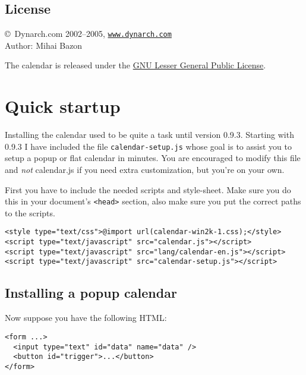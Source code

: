 \documentclass[a4paper,twoside,10pt]{dynadoc}
\begin{document}
\subsection{License}

\begin{center}
\noindent \copyright\ Dynarch.com 2002--2005,
\href{http://www.dynarch.com/}{\texttt{www.dynarch.com}}\\
Author: Mihai Bazon
\end{center}

The calendar is released under the
{\href{http://www.gnu.org/licenses/lgpl.html}{GNU Lesser General Public License}}.




\section{Quick startup}\label{sec:quick-start}

Installing the calendar used to be quite a task until version 0.9.3.  Starting
with 0.9.3 I have included the file \texttt{calendar-setup.js} whose goal is to
assist you to setup a popup or flat calendar in minutes.  You are
encouraged to modify this file and \emph{not} calendar.js if you need
extra customization, but you're on your own.

First you have to include the needed scripts and style-sheet.  Make sure you do
this in your document's \texttt{<head>} section, also make sure you put the
correct paths to the scripts.

\begin{verbatim}
<style type="text/css">@import url(calendar-win2k-1.css);</style>
<script type="text/javascript" src="calendar.js"></script>
<script type="text/javascript" src="lang/calendar-en.js"></script>
<script type="text/javascript" src="calendar-setup.js"></script>
\end{verbatim}

\subsection{Installing a popup calendar}\label{sec:quick-start-popup}

\noindent Now suppose you have the following HTML:

\begin{verbatim}
<form ...>
  <input type="text" id="data" name="data" />
  <button id="trigger">...</button>
</form>
\end{verbatim}
\end{document}
